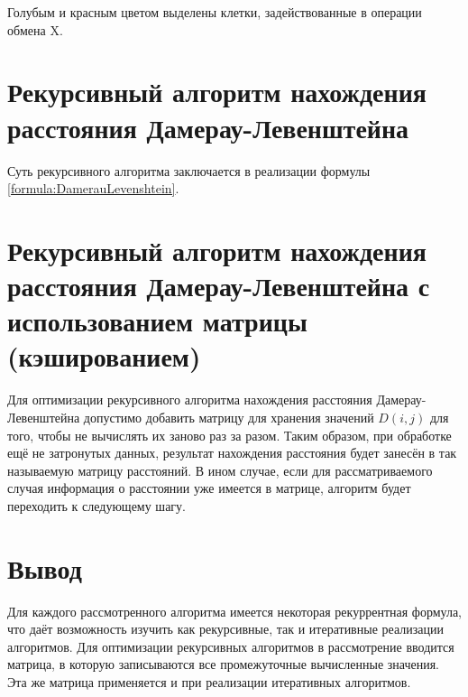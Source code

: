 	Голубым и красным цветом выделены клетки, задействованные в операции обмена X.

	\section{Рекурсивный алгоритм нахождения расстояния Дамерау-Левенштейна}	


	Суть рекурсивного алгоритма заключается в реализации формулы \ref{formula:DamerauLevenshtein}.
	
	\section{Рекурсивный алгоритм нахождения расстояния Дамерау-Левенштейна с использованием матрицы (кэшированием)}
		
		
	Для оптимизации рекурсивного алгоритма нахождения расстояния Дамерау-Левенштейна допустимо добавить матрицу для хранения значений $D(i, j)$ для того, чтобы не вычислять их заново раз за разом. Таким образом, при обработке ещё не затронутых данных, результат нахождения расстояния будет занесён в так называемую матрицу расстояний. В ином случае, если для рассматриваемого случая информация о расстоянии уже имеется в матрице, алгоритм будет переходить к следующему шагу.


	
	\section*{Вывод}

	
	Для каждого рассмотренного алгоритма имеется некоторая рекуррентная формула, что даёт возможность изучить как рекурсивные, так и итеративные реализации алгоритмов. Для оптимизации рекурсивных алгоритмов в рассмотрение вводится матрица, в которую записываются все промежуточные вычисленные значения. Эта же матрица применяется и при реализации итеративных алгоритмов.
\newpage